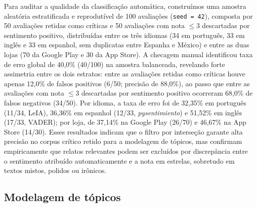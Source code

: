 Para auditar a qualidade da classificação automática, construímos uma amostra aleatória estratificada e reprodutível de 100 avaliações (\texttt{seed = 42}), composta por 50 avaliações retidas como críticas e 50 avaliações com nota $\le 3$ descartadas por sentimento positivo, distribuídas entre os três idiomas (34 em português, 33 em inglês e 33 em espanhol, sem duplicatas entre Espanha e México) e entre as duas lojas (70 da Google Play e 30 da App Store). A checagem manual identificou taxa de erro global de 40{,}0\% (40/100) na amostra balanceada, revelando forte assimetria entre os dois estratos: entre as avaliações retidas como críticas houve apenas 12{,}0\% de falsos positivos (6/50; precisão de 88{,}0\%), ao passo que entre as avaliações com nota $\le 3$ descartadas por sentimento positivo ocorreram 68{,}0\% de falsos negativos (34/50). Por idioma, a taxa de erro foi de 32{,}35\% em português (11/34, LeIA), 36{,}36\% em espanhol (12/33, \textit{pysentimiento}) e 51{,}52\% em inglês (17/33, VADER); por loja, de 37{,}14\% na Google Play (26/70) e 46{,}67\% na App Store (14/30). Esses resultados indicam que o filtro por interseção garante alta precisão no corpus crítico retido para a modelagem de tópicos, mas confirmam empiricamente que relatos relevantes podem ser excluídos por discrepância entre o sentimento atribuído automaticamente e a nota em estrelas, sobretudo em textos mistos, polidos ou irônicos.

\subsection{Modelagem de tópicos}


